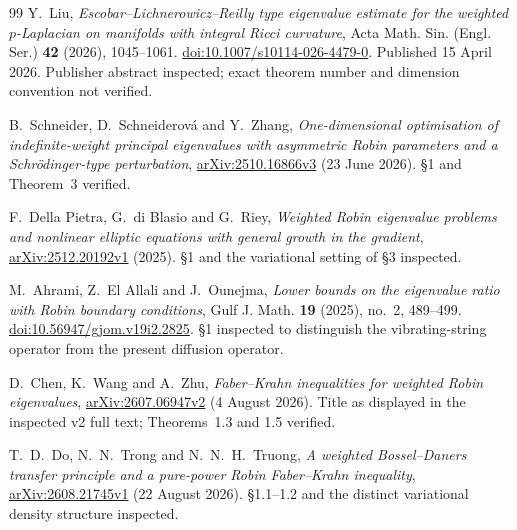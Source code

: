 \documentclass[12pt]{amsart}
\theoremstyle{definition}
\theoremstyle{remark}
\numberwithin{equation}{section}
\begin{document}
\begin{thebibliography}{99}
 Y.~Liu,
\emph{Escobar--Lichnerowicz--Reilly type eigenvalue estimate for the weighted $p$-Laplacian on manifolds with integral Ricci curvature},
Acta Math. Sin. (Engl. Ser.) \textbf{42} (2026), 1045--1061.
\href{https://doi.org/10.1007/s10114-026-4479-0}{doi:10.1007/s10114-026-4479-0}.
Published 15 April 2026. Publisher abstract inspected; exact theorem number and dimension convention not verified.

 B.~Schneider, D.~Schneiderov\'a and Y.~Zhang,
\emph{One-dimensional optimisation of indefinite-weight principal eigenvalues with asymmetric Robin parameters and a Schr\"odinger-type perturbation},
\href{https://arxiv.org/abs/2510.16866v3}{arXiv:2510.16866v3} (23 June 2026).
\S1 and Theorem~3 verified.

 F.~Della Pietra, G.~di Blasio and G.~Riey,
\emph{Weighted Robin eigenvalue problems and nonlinear elliptic equations with general growth in the gradient},
\href{https://arxiv.org/abs/2512.20192v1}{arXiv:2512.20192v1} (2025).
\S1 and the variational setting of \S3 inspected.

 M.~Ahrami, Z.~El Allali and J.~Ounejma,
\emph{Lower bounds on the eigenvalue ratio with Robin boundary conditions},
Gulf J. Math. \textbf{19} (2025), no.~2, 489--499.
\href{https://doi.org/10.56947/gjom.v19i2.2825}{doi:10.56947/gjom.v19i2.2825}.
\S1 inspected to distinguish the vibrating-string operator from the present diffusion operator.

 D.~Chen, K.~Wang and A.~Zhu,
\emph{Faber--Krahn inequalities for weighted Robin eigenvalues},
\href{https://arxiv.org/html/2607.06947v2}{arXiv:2607.06947v2} (4 August 2026).
Title as displayed in the inspected v2 full text; Theorems~1.3 and 1.5 verified.

 T.~D.~Do, N.~N.~Trong and N.~N.~H.~Truong,
\emph{A weighted Bossel--Daners transfer principle and a pure-power Robin Faber--Krahn inequality},
\href{https://arxiv.org/abs/2608.21745v1}{arXiv:2608.21745v1} (22 August 2026).
\S1.1--1.2 and the distinct variational density structure inspected.
\end{thebibliography}
\end{document}
